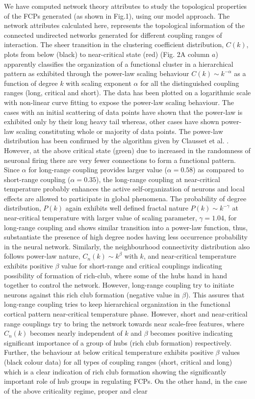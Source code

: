\documentclass[preprintnumbers,amsmath,amssymb,onecolumn]{revtex4}
\begin{document}
{\noindent}We have computed network theory attributes to study the topological properties of the FCPs generated (as shown in Fig.1), using our model approach. The network attributes calculated here, represents the topological information of the connected undirected networks generated for different coupling ranges of interaction. The sheer transition in the clustering coefficient distribution, $C(k)$, plots from below (black) to near-critical state (red) (Fig. 2A column $a$) apparently classifies the organization of a functional cluster in a hierarchical pattern as exhibited through the power-law scaling behaviour $C(k)\sim k^{-\alpha}$ as a function of degree $k$ with scaling exponent $\alpha$ for all the distinguished coupling ranges (long, critical and short). The data has been plotted on a logarithmic scale with non-linear curve fitting to expose the power-law scaling behaviour. The cases with an initial scattering of data points have shown that the power-law is exhibited only by their long heavy tail whereas, other cases have shown power-law scaling constituting whole or majority of data points. The power-law distribution has been confirmed by the algorithm given by Clausset et al. \citep{clauset2009}. However, at the above critical state (green) due to increased in the randomness of neuronal firing there are very fewer connections to form a functional pattern. Since $\alpha$ for long-range coupling provides larger value ($\alpha=0.58$) as compared to short-range coupling ($\alpha=0.35$), the long-range coupling at near-critical temperature probably enhances the active self-organization of neurons and local effects are allowed to participate in global phenomena. The probability of degree distribution, $P(k)$ again exhibits well defined fractal nature $P(k)\sim k^{-\gamma}$ at near-critical temperature with larger value of scaling parameter, $\gamma=1.04$, for long-range coupling and shows similar transition into a power-law function, thus, substantiate the presence of high degree nodes having less occurrence probability in the neural network. Similarly, the neighbourhood connectivity distribution also follows power-law nature, $C_{n}(k)\sim k^\beta$ with $k$, and near-critical temperature exhibits positive $\beta$ value for short-range and critical couplings indicating possibility of formation of rich-club, where some of the hubs hand in hand together to control the network. However, long-range coupling try to initiate neurons against this rich club formation (negative value in $\beta$). This assures that long-range coupling tries to keep hierarchical organization in the functional cortical pattern near-critical temperature phase. However, short and near-critical range couplings try to bring the network towards near scale-free features, where $C_n(k)$ becomes nearly independent of $k$ and $\beta$ becomes positive indicating significant importance of a group of hubs (rich club formation) respectively. Further, the behaviour at below critical temperature exhibits positive $\beta$ values (black colour data) for all types of coupling ranges (short, critical and long) which is a clear indication of rich club formation showing the significantly important role of hub groups in regulating FCPs. On the other hand, in the case of the above criticality regime, proper and clear 
\end{document}
